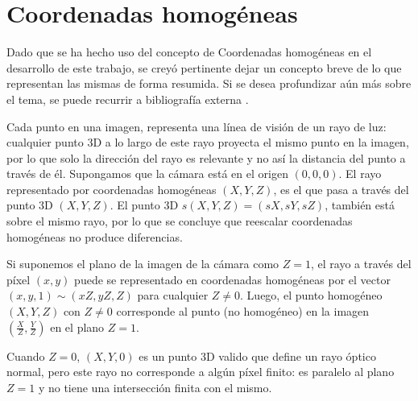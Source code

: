 

\section{Coordenadas homogéneas}
Dado que se ha hecho uso del concepto de Coordenadas homogéneas en el desarrollo de este trabajo, se creyó pertinente dejar un concepto breve de lo que representan las mismas de forma resumida. Si se desea profundizar aún más sobre el tema, se puede recurrir a bibliografía externa \cite{Hartley2004}.

Cada punto en una imagen, representa una línea de visión de un rayo de luz: cualquier punto 3D a lo largo de este rayo proyecta el mismo punto en la imagen, por lo que solo la dirección del rayo es relevante y no así la distancia del punto a través de él. 
Supongamos que la cámara está en el origen $(0,0,0)$. El rayo representado por coordenadas homogéneas $(X,Y,Z)$, es el que pasa a través del punto 3D $(X,Y,Z)$. El punto 3D $s(X,Y,Z)=(sX,sY,sZ)$, también está sobre el mismo rayo, por lo que se concluye que reescalar coordenadas homogéneas no produce diferencias.

Si suponemos el plano de la imagen de la cámara como $Z=1$, el rayo a través del píxel $(x,y)$ puede se representado en coordenadas homogéneas por el vector $(x,y,1) \sim (xZ, yZ, Z)$ para cualquier $Z \neq 0$. Luego, el punto homogéneo $(X,Y,Z)$ con $Z \neq 0$ corresponde al punto (no homogéneo) en la imagen $(\frac{X}{Z}, \frac{Y}{Z})$ en el plano $Z=1$.

Cuando $Z=0$, $(X,Y,0)$ es un punto 3D valido que define un rayo óptico normal, pero este rayo no corresponde a algún píxel finito: es paralelo al plano $Z=1$ y no tiene una intersección finita con el mismo.

